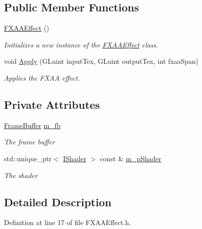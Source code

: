 \subsection*{Public Member Functions}
\begin{DoxyCompactItemize}
\item 
\hyperlink{class_f_x_a_a_effect_a86127f37cfc0a67e3a96cb7c5a498988}{F\+X\+A\+A\+Effect} ()
\begin{DoxyCompactList}\small\item\em Initializes a new instance of the \hyperlink{class_f_x_a_a_effect}{F\+X\+A\+A\+Effect} class. \end{DoxyCompactList}\item 
void \hyperlink{class_f_x_a_a_effect_ad4c4777a05cb6ebe60b0f976fbd519ce}{Apply} (G\+Luint input\+Tex, G\+Luint output\+Tex, int fxaa\+Span)
\begin{DoxyCompactList}\small\item\em Applies the F\+X\+AA effect. \end{DoxyCompactList}\end{DoxyCompactItemize}
\subsection*{Private Attributes}
\begin{DoxyCompactItemize}
\item 
\hyperlink{class_frame_buffer}{Frame\+Buffer} \hyperlink{class_f_x_a_a_effect_a7bab788a74fa45f3383a99cd3c8f6425}{m\+\_\+fb}
\begin{DoxyCompactList}\small\item\em The frame buffer \end{DoxyCompactList}\item 
std\+::unique\+\_\+ptr$<$ \hyperlink{class_i_shader}{I\+Shader} $>$ const \& \hyperlink{class_f_x_a_a_effect_ad80cc67deda40415c1944b6b6bad9895}{m\+\_\+p\+Shader}
\begin{DoxyCompactList}\small\item\em The shader \end{DoxyCompactList}\end{DoxyCompactItemize}


\subsection{Detailed Description}


Definition at line 17 of file F\+X\+A\+A\+Effect.\+h.



